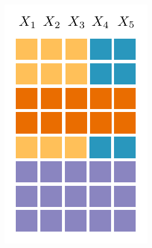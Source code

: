 \documentclass[xcolor={usenames,dvipsnames,svgnames}, compress]{beamer}
\begin{document}
\begin{frame}
\begin{minipage}[t]{1.3462cm}
    \includegraphics[width=\linewidth]{figures/grid-2}
  \end{minipage}\hspace{10pt}\begin{minipage}[t]{1.3909cm}

\end{minipage}
\end{frame}
\end{document}
